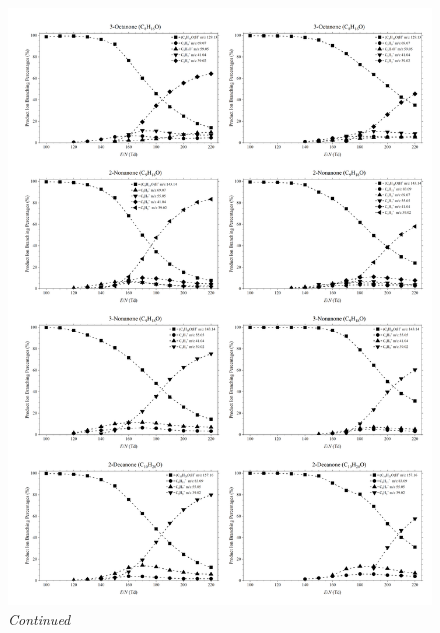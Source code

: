 \begin{figure}\ContinuedFloat
\centering
\includegraphics[width=1\textwidth]{pics/ketones/plot_4.png}
\caption{\textit{Continued}}
\end{figure}
